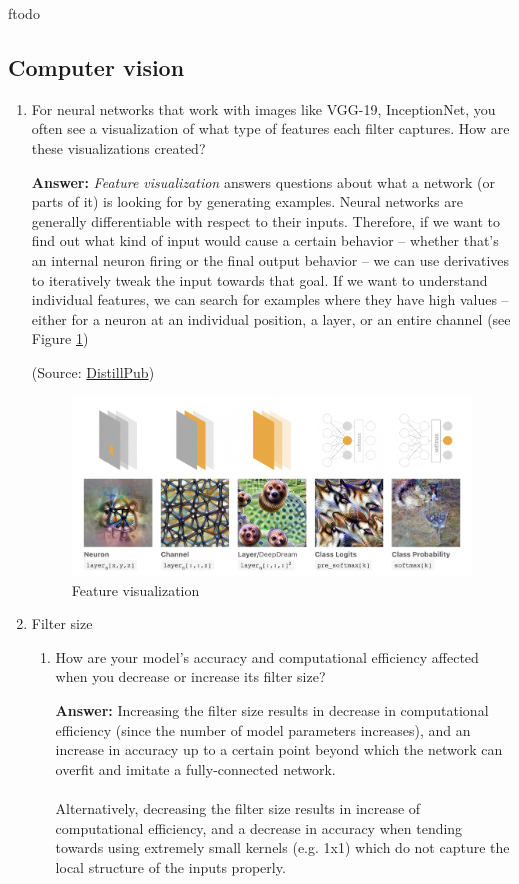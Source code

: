 ƒtodo\documentclass{article}
\newenvironment{QandA}{\begin{enumerate}[label=\arabic*.]}{\end{enumerate}}
\newenvironment{InnerQandA}{\begin{enumerate}[label=\roman*.]}{\end{enumerate}}
\newenvironment{answer}{\par\normalfont \textbf{Answer:}}{}
\begin{document}
\subsection{Computer vision}
\begin{QandA}
    \item For neural networks that work with images like VGG-19, InceptionNet, you often see a visualization of what type of features each filter captures. How are these visualizations created?
    \begin{answer}
        \textit{Feature visualization} answers questions about what a network (or parts of it) is looking for by generating examples. Neural networks are generally differentiable with respect to their inputs. Therefore, if we want to find out what kind of input would cause a certain behavior -- whether that's an internal neuron firing or the final output behavior -- we can use derivatives to iteratively tweak the input towards that goal. If we want to understand individual features, we can search for examples where they have high values -- either for a neuron at an individual position, a layer, or an entire channel (see Figure \ref{fig:feature-visualization})

        (Source: \href{https://distill.pub/2017/feature-visualization/}{DistillPub})
    \end{answer}
    \begin{figure}[h!]
        \centering
        \includegraphics[width=0.7\columnwidth]{img/feature-visualization.png}
        \caption{Feature visualization}
        \label{fig:feature-visualization}
    \end{figure}

    \item Filter size
    \begin{InnerQandA}
        \item How are your model’s accuracy and computational efficiency affected when you decrease or increase its filter size?
        \begin{answer}
            Increasing the filter size results in decrease in computational efficiency (since the number of model parameters increases), and an increase in accuracy up to a certain point beyond which the network can overfit and imitate a fully-connected network. \\\\
            Alternatively, decreasing the filter size results in increase of computational efficiency, and a decrease in accuracy when tending towards using extremely small kernels (e.g. 1x1) which do not capture the local structure of the inputs properly.
        \end{answer}


\end{InnerQandA}
\end{QandA}
\end{document}
